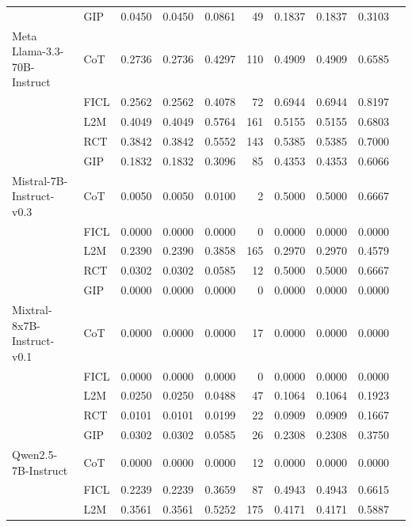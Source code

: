 \documentclass[conference]{IEEEtran}
\begin{document}
\begin{longtable}{p{3.5cm} l r r r r r r r r}
                  & GIP  & 0.0450 & 0.0450 & 0.0861 & 49 & 0.1837 & 0.1837 & 0.3103 \\ \addlinespace
Meta Llama-3.3-70B-Instruct & CoT  & 0.2736 & 0.2736 & 0.4297 & 110 & 0.4909 & 0.4909 & 0.6585 \\
                            & FICL & 0.2562 & 0.2562 & 0.4078 & 72 & 0.6944 & 0.6944 & 0.8197 \\
                            & L2M  & 0.4049 & 0.4049 & 0.5764 & 161 & 0.5155 & 0.5155 & 0.6803 \\
                            & RCT  & 0.3842 & 0.3842 & 0.5552 & 143 & 0.5385 & 0.5385 & 0.7000 \\
                            & GIP  & 0.1832 & 0.1832 & 0.3096 & 85 & 0.4353 & 0.4353 & 0.6066 \\ \addlinespace
Mistral-7B-Instruct-v0.3 & CoT  & 0.0050 & 0.0050 & 0.0100 & 2 & 0.5000 & 0.5000 & 0.6667 \\
                         & FICL & 0.0000 & 0.0000 & 0.0000 & 0 & 0.0000 & 0.0000 & 0.0000 \\
                         & L2M  & 0.2390 & 0.2390 & 0.3858 & 165 & 0.2970 & 0.2970 & 0.4579 \\
                         & RCT  & 0.0302 & 0.0302 & 0.0585 & 12 & 0.5000 & 0.5000 & 0.6667 \\
                         & GIP  & 0.0000 & 0.0000 & 0.0000 & 0 & 0.0000 & 0.0000 & 0.0000 \\ \addlinespace
Mixtral-8x7B-Instruct-v0.1 & CoT  & 0.0000 & 0.0000 & 0.0000 & 17 & 0.0000 & 0.0000 & 0.0000 \\
                           & FICL & 0.0000 & 0.0000 & 0.0000 & 0 & 0.0000 & 0.0000 & 0.0000 \\
                           & L2M  & 0.0250 & 0.0250 & 0.0488 & 47 & 0.1064 & 0.1064 & 0.1923 \\
                           & RCT  & 0.0101 & 0.0101 & 0.0199 & 22 & 0.0909 & 0.0909 & 0.1667 \\
                           & GIP  & 0.0302 & 0.0302 & 0.0585 & 26 & 0.2308 & 0.2308 & 0.3750 \\ \addlinespace
Qwen2.5-7B-Instruct & CoT  & 0.0000 & 0.0000 & 0.0000 & 12 & 0.0000 & 0.0000 & 0.0000 \\
                    & FICL & 0.2239 & 0.2239 & 0.3659 & 87 & 0.4943 & 0.4943 & 0.6615 \\
                    & L2M  & 0.3561 & 0.3561 & 0.5252 & 175 & 0.4171 & 0.4171 & 0.5887 \\

\end{longtable}
\end{document}
